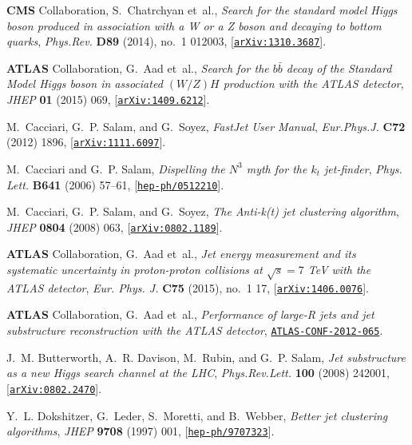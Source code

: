 \documentclass[a4paper,11pt]{article}
\begin{document}
\begin{thebibliography}{100}
  
{\bf CMS} Collaboration, S.~Chatrchyan et~al., {\it {Search for the standard
  model Higgs boson produced in association with a W or a Z boson and decaying
  to bottom quarks}},  {\em Phys.Rev.} {\bf D89} (2014), no.~1 012003,
  [\href{http://arxiv.org/abs/1310.3687}{{\tt arXiv:1310.3687}}].

{\bf ATLAS} Collaboration, G.~Aad et~al., {\it {Search for the $b\bar{b}$ decay
  of the Standard Model Higgs boson in associated $(W/Z)H$ production with the
  ATLAS detector}},  {\em JHEP} {\bf 01} (2015) 069,
  [\href{http://arxiv.org/abs/1409.6212}{{\tt arXiv:1409.6212}}].

M.~Cacciari, G.~P. Salam, and G.~Soyez, {\it {FastJet User Manual}},  {\em
  Eur.Phys.J.} {\bf C72} (2012) 1896,
  [\href{http://arxiv.org/abs/1111.6097}{{\tt arXiv:1111.6097}}].

M.~Cacciari and G.~P. Salam, {\it {Dispelling the $N^{3}$ myth for the $k_t$
  jet-finder}},  {\em Phys. Lett.} {\bf B641} (2006) 57--61,
  [\href{http://arxiv.org/abs/hep-ph/0512210}{{\tt hep-ph/0512210}}].

M.~Cacciari, G.~P. Salam, and G.~Soyez, {\it {The Anti-k(t) jet clustering
  algorithm}},  {\em JHEP} {\bf 0804} (2008) 063,
  [\href{http://arxiv.org/abs/0802.1189}{{\tt arXiv:0802.1189}}].

{\bf ATLAS} Collaboration, G.~Aad et~al., {\it {Jet energy measurement and its
  systematic uncertainty in proton-proton collisions at $\sqrt{s}=7$ TeV with
  the ATLAS detector}},  {\em Eur. Phys. J.} {\bf C75} (2015), no.~1 17,
  [\href{http://arxiv.org/abs/1406.0076}{{\tt arXiv:1406.0076}}].

{\bf ATLAS} Collaboration, G.~Aad et~al., {\it {Performance of large-R jets and
  jet substructure reconstruction with the ATLAS detector}},
  \href{http://arxiv.org/abs/ATLAS-CONF-2012-065}{{\tt ATLAS-CONF-2012-065}}.

J.~M. Butterworth, A.~R. Davison, M.~Rubin, and G.~P. Salam, {\it {Jet
  substructure as a new Higgs search channel at the LHC}},  {\em
  Phys.Rev.Lett.} {\bf 100} (2008) 242001,
  [\href{http://arxiv.org/abs/0802.2470}{{\tt arXiv:0802.2470}}].

Y.~L. Dokshitzer, G.~Leder, S.~Moretti, and B.~Webber, {\it {Better jet
  clustering algorithms}},  {\em JHEP} {\bf 9708} (1997) 001,
  [\href{http://arxiv.org/abs/hep-ph/9707323}{{\tt hep-ph/9707323}}].


\end{thebibliography}
\end{document}
